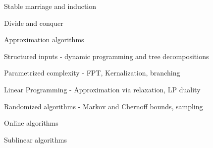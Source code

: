 \documentclass[a4paper]{article}
\newenvironment{itemize*}%
  {\begin{itemize}%
    \setlength{\itemsep}{0pt}%
    \setlength{\parsep}{0pt}%
    \setlength{\parskip}{0pt}}%
  {\end{itemize}}
\begin{document}
\begin{itemize*}
  \item Stable marriage and induction
  \item Divide and conquer
  \item Approximation algorithms
  \item Structured inputs - dynamic programming and tree decompositions
  \item Parametrized complexity - FPT, Kernalization, branching
  \item Linear Programming - Approximation via relaxation, LP duality
  \item Randomized algorithms - Markov and Chernoff bounds, sampling
  \item Online algorithms
  \item Sublinear algorithms
\end{itemize*}
\end{document}

